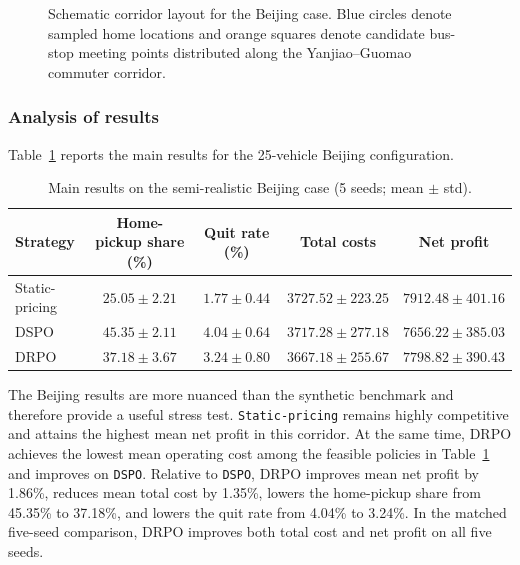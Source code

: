 \documentclass[preprint,12pt,authoryear]{elsarticle}
\begin{document}
\begin{figure}[t]
\centering
{}
\caption{Schematic corridor layout for the Beijing case. Blue circles denote sampled home locations and orange squares denote candidate bus-stop meeting points distributed along the Yanjiao--Guomao commuter corridor.}
\label{fig:beijing-layout}
\end{figure}

\subsubsection{Analysis of results}

Table~\ref{tab:beijing} reports the main results for the 25-vehicle Beijing configuration.

\begin{table}[t]
\centering
\caption{Main results on the semi-realistic Beijing case (5 seeds; mean $\pm$ std).}
\label{tab:beijing}
\small
\begin{tabular}{lcccc}
\toprule
Strategy & Home-pickup share (\%) & Quit rate (\%) & Total costs & Net profit \\
\midrule
Static-pricing & $25.05 \pm 2.21$ & $1.77 \pm 0.44$ & $3727.52 \pm 223.25$ & $7912.48 \pm 401.16$ \\
DSPO & $45.35 \pm 2.11$ & $4.04 \pm 0.64$ & $3717.28 \pm 277.18$ & $7656.22 \pm 385.03$ \\
DRPO & $37.18 \pm 3.67$ & $3.24 \pm 0.80$ & $3667.18 \pm 255.67$ & $7798.82 \pm 390.43$ \\
\bottomrule
\end{tabular}
\end{table}

The Beijing results are more nuanced than the synthetic benchmark and therefore provide a useful stress test. \texttt{Static-pricing} remains highly competitive and attains the highest mean net profit in this corridor. At the same time, DRPO achieves the lowest mean operating cost among the feasible policies in Table~\ref{tab:beijing} and improves on \texttt{DSPO}. Relative to \texttt{DSPO}, DRPO improves mean net profit by 1.86\%, reduces mean total cost by 1.35\%, lowers the home-pickup share from 45.35\% to 37.18\%, and lowers the quit rate from 4.04\% to 3.24\%. In the matched five-seed comparison, DRPO improves both total cost and net profit on all five seeds.
\end{document}

